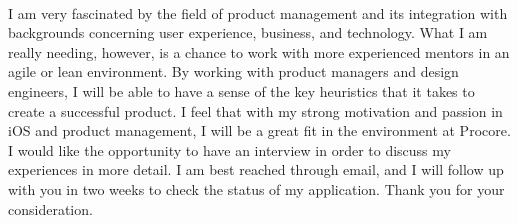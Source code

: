 \documentclass[11pt,letterpaper,sans,english]{moderncv}        %
\begin{document}
\\[3mm]
I am very fascinated by the field of product management and its integration with backgrounds concerning user experience, business, and technology. What I am really needing, however, is a chance to work with more experienced mentors in an agile or lean environment.  By working with product managers and design engineers, I will be able to have a sense of the key heuristics that it takes to create a successful product. I feel that with my strong motivation and passion in iOS and product management, I will be a great fit in the environment at Procore. I would like the opportunity to have an interview in order to discuss my experiences in more detail. I am best reached through email, and I will follow up with you in two weeks to check the status of my application. Thank you for your consideration.\\[3mm]


\makeletterclosing
\end{document}
